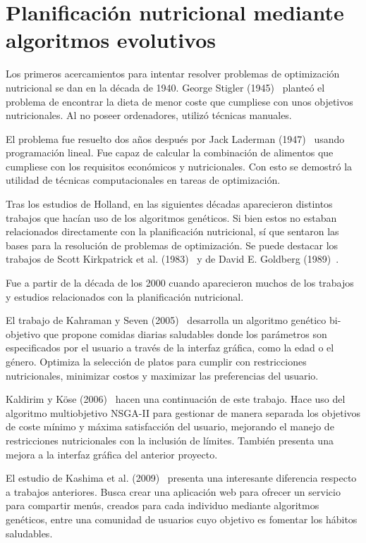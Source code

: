 \section{Planificación nutricional mediante algoritmos evolutivos}

Los primeros acercamientos para intentar resolver problemas de optimización nutricional se dan en la década de 1940. George Stigler (1945)~\cite{stigler1945} planteó el problema de encontrar la dieta de menor coste que cumpliese con unos objetivos nutricionales. Al no poseer ordenadores, utilizó técnicas manuales.

El problema fue resuelto dos años después por Jack Laderman (1947)~\cite{problemasdedietas} usando programación lineal. Fue capaz de calcular la combinación de alimentos que cumpliese con los requisitos económicos y nutricionales. Con esto se demostró la utilidad de técnicas computacionales en tareas de optimización.

Tras los estudios de Holland, en las siguientes décadas aparecieron distintos trabajos que hacían uso de los algoritmos genéticos. Si bien estos no estaban relacionados directamente con la planificación nutricional, sí que sentaron las bases para la resolución de problemas de optimización. Se puede destacar los trabajos de Scott Kirkpatrick et al. (1983)~\cite{kirkpatrick1983} y de David E. Goldberg (1989)~\cite{goldberg1989}.

Fue a partir de la década de los 2000 cuando aparecieron muchos de los trabajos y estudios relacionados con la planificación nutricional.

El trabajo de Kahraman y Seven (2005)~\cite{kahraman2005} desarrolla un algoritmo genético bi-objetivo que propone comidas diarias saludables donde los parámetros son especificados por el usuario a través de la interfaz gráfica, como la edad o el género. Optimiza la selección de platos para cumplir con restricciones nutricionales, minimizar costos y maximizar las preferencias del usuario.

Kaldirim y Köse (2006)~\cite{kaldirim2006} hacen una continuación de este trabajo. Hace uso del algoritmo multiobjetivo NSGA-II para gestionar de manera separada los objetivos de coste mínimo y máxima satisfacción del usuario, mejorando el manejo de restricciones nutricionales con la inclusión de límites. También presenta una mejora a la interfaz gráfica del anterior proyecto.

El estudio de Kashima et al. (2009)~\cite{kashima2009} presenta una interesante diferencia respecto a trabajos anteriores. Busca crear una aplicación web para ofrecer un servicio para compartir menús, creados para cada individuo mediante algoritmos genéticos, entre una comunidad de usuarios cuyo objetivo es fomentar los hábitos saludables.

